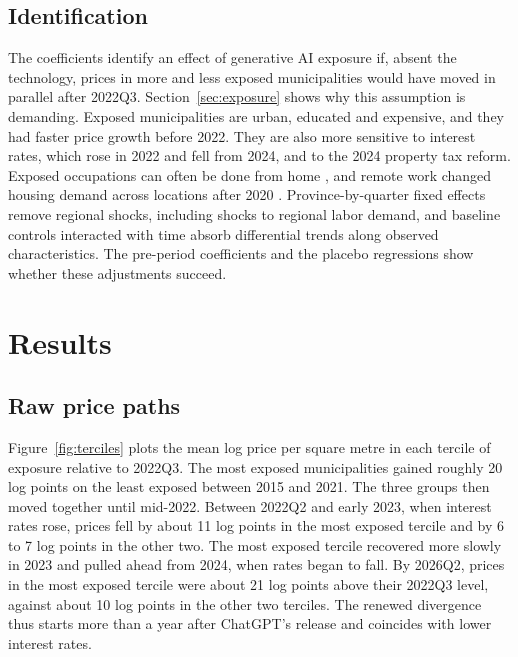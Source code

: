 \documentclass[12pt]{article}
\begin{document}
\subsection{Identification}

The coefficients identify an effect of generative AI exposure if, absent the technology, prices in more and less exposed municipalities would have moved in parallel after 2022Q3. Section~\ref{sec:exposure} shows why this assumption is demanding. Exposed municipalities are urban, educated and expensive, and they had faster price growth before 2022. They are also more sensitive to interest rates, which rose in 2022 and fell from 2024, and to the 2024 property tax reform. Exposed occupations can often be done from home \citep{dingel2020}, and remote work changed housing demand across locations after 2020 \citep{gupta2022, mondragon2022}. Province-by-quarter fixed effects remove regional shocks, including shocks to regional labor demand, and baseline controls interacted with time absorb differential trends along observed characteristics. The pre-period coefficients and the placebo regressions show whether these adjustments succeed.

\section{Results}\label{sec:results}

\subsection{Raw price paths}

Figure~\ref{fig:terciles} plots the mean log price per square metre in each tercile of exposure relative to 2022Q3. The most exposed municipalities gained roughly 20 log points on the least exposed between 2015 and 2021. The three groups then moved together until mid-2022. Between 2022Q2 and early 2023, when interest rates rose, prices fell by about 11 log points in the most exposed tercile and by 6 to 7 log points in the other two. The most exposed tercile recovered more slowly in 2023 and pulled ahead from 2024, when rates began to fall. By 2026Q2, prices in the most exposed tercile were about 21 log points above their 2022Q3 level, against about 10 log points in the other two terciles. The renewed divergence thus starts more than a year after ChatGPT's release and coincides with lower interest rates.
\end{document}
